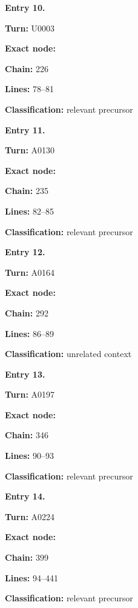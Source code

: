 
\textbf{Entry 10.}

\textbf{Turn:} U0003

\textbf{Exact node:} \protect{}

\textbf{Chain:} 226

\textbf{Lines:} 78--81

\textbf{Classification:} relevant precursor


\textbf{Entry 11.}

\textbf{Turn:} A0130

\textbf{Exact node:} \protect{}

\textbf{Chain:} 235

\textbf{Lines:} 82--85

\textbf{Classification:} relevant precursor


\textbf{Entry 12.}

\textbf{Turn:} A0164

\textbf{Exact node:} \protect{}

\textbf{Chain:} 292

\textbf{Lines:} 86--89

\textbf{Classification:} unrelated context


\textbf{Entry 13.}

\textbf{Turn:} A0197

\textbf{Exact node:} \protect{}

\textbf{Chain:} 346

\textbf{Lines:} 90--93

\textbf{Classification:} relevant precursor


\textbf{Entry 14.}

\textbf{Turn:} A0224

\textbf{Exact node:} \protect{}

\textbf{Chain:} 399

\textbf{Lines:} 94--441

\textbf{Classification:} relevant precursor


